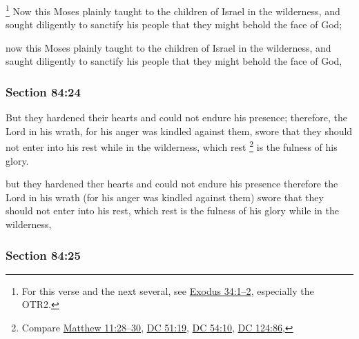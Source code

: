 			\footnote{%
				For this verse and the next several, see \hyperref[EXODUS-34-1]{Exodus 34:1--2}, especially the OTR2.
				}%
		Now this Moses plainly taught to the children of Israel in the wilderness, and sought diligently to sanctify his people that they might behold the face of God;

		\begin{framed}
		\scriptsize
			\begin{compactdesc}
				\item[JSP] now this Moses plainly taught to the children of Israel in the wilderness, and saught diligently to sanctify his people that they might behold the face of God,
			\end{compactdesc}
		\end{framed}

	\subsubsection{Section 84:24} %
		\label{DC84-24}

		But they hardened their hearts and could not endure his presence; therefore, the Lord in his wrath, for his anger was kindled against them, swore that they should not enter into his rest while in the wilderness, which rest%
			\footnote{%
				Compare \hyperref[MATTHEW-11-28]{Matthew 11:28--30}, \hyperref[DC51-19]{DC 51:19}, \hyperref[DC54-10]{DC 54:10}, \hyperref[DC124-86]{DC 124:86}, 
				}
		is the fulness of his glory.

		\begin{framed}
		\scriptsize
			\begin{compactdesc}
				\item[JSP] but they hardened ther hearts and could not endure his presence therefore the Lord in his wrath (for his anger was kindled against them) swore that they should not enter into his rest, which rest is the fulness of his glory while in the wilderness,
			\end{compactdesc}
		\end{framed}

	\subsubsection{Section 84:25} %
		\label{DC84-25}

